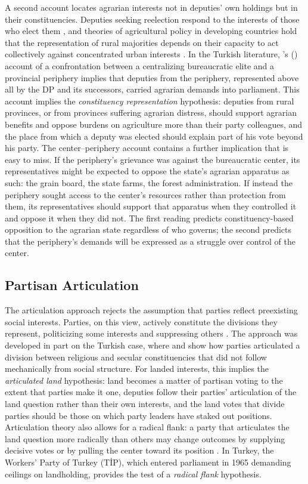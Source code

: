 \documentclass[12pt]{article}
\begin{document}
A second account locates agrarian interests not in deputies' own holdings but in their constituencies. Deputies seeking reelection respond to the interests of those who elect them \citep{mayhew1974}, and theories of agricultural policy in developing countries hold that the representation of rural majorities depends on their capacity to act collectively against concentrated urban interests \citep{bates1981,olson1965}. In the Turkish literature, \citeauthor{mardin1973}'s (\citeyear{mardin1973}) account of a confrontation between a centralizing bureaucratic elite and a provincial periphery implies that deputies from the periphery, represented above all by the DP and its successors, carried agrarian demands into parliament. This account implies the \textit{constituency representation} hypothesis: deputies from rural provinces, or from provinces suffering agrarian distress, should support agrarian benefits and oppose burdens on agriculture more than their party colleagues, and the place from which a deputy was elected should explain part of his vote beyond his party. The center--periphery account contains a further implication that is easy to miss. If the periphery's grievance was against the bureaucratic center, its representatives might be expected to oppose the state's agrarian apparatus as such: the grain board, the state farms, the forest administration. If instead the periphery sought access to the center's resources rather than protection from them, its representatives should support that apparatus when they controlled it and oppose it when they did not. The first reading predicts constituency-based opposition to the agrarian state regardless of who governs; the second predicts that the periphery's demands will be expressed as a struggle over control of the center.

\subsection*{Partisan Articulation}

The articulation approach rejects the assumption that parties reflect preexisting social interests. Parties, on this view, actively constitute the divisions they represent, politicizing some interests and suppressing others \citep{deleon2009,deleon2015,eidlin2016}. The approach was developed in part on the Turkish case, where \citet{deleon2009} and \citet{tugal2009} show how parties articulated a division between religious and secular constituencies that did not follow mechanically from social structure. For landed interests, this implies the \textit{articulated land} hypothesis: land becomes a matter of partisan voting to the extent that parties make it one, deputies follow their parties' articulation of the land question rather than their own interests, and the land votes that divide parties should be those on which party leaders have staked out positions. Articulation theory also allows for a radical flank: a party that articulates the land question more radically than others may change outcomes by supplying decisive votes or by pulling the center toward its position \citep{haines1984}. In Turkey, the Workers' Party of Turkey (TİP), which entered parliament in 1965 demanding ceilings on landholding, provides the test of a \textit{radical flank} hypothesis.
\end{document}
